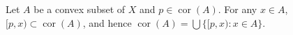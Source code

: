 Let $A$ be a convex subset of $X$ and $p \in \operatorname{cor}(A)$. For any $x \in A$, $[p, x) \subset \operatorname{cor}(A)$, and hence $\operatorname{cor}(A) = \bigcup \{[p, x) : x \in A\}$.
